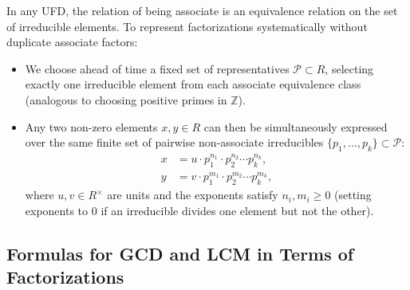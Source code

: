 \begin{content}
\begin{steps}
In any UFD, the relation of being associate is an equivalence relation on the set of irreducible elements. To represent factorizations systematically without duplicate associate factors:
\begin{itemize}
    \item We choose ahead of time a fixed set of representatives $\mathcal{P} \subset R$, selecting exactly one irreducible element from each associate equivalence class (analogous to choosing positive primes in $\mathbb{Z}$).
    \item Any two non-zero elements $x, y \in R$ can then be simultaneously expressed over the same finite set of pairwise non-associate irreducibles $\{p_1, \dots, p_k\} \subset \mathcal{P}$:
    \begin{align}
    x &= u \cdot p_1^{n_1} \cdot p_2^{n_2} \cdots p_k^{n_k}, \label{eq:part4-x-grouped-fact} \\
    y &= v \cdot p_1^{m_1} \cdot p_2^{m_2} \cdots p_k^{m_k}, \label{eq:part4-y-grouped-fact}
    \end{align}
    where $u, v \in R^\times$ are units and the exponents satisfy $n_i, m_i \ge 0$ (setting exponents to $0$ if an irreducible divides one element but not the other).
\end{itemize}
\end{steps}
\end{content}

\subsection{Formulas for GCD and LCM in Terms of Factorizations}

